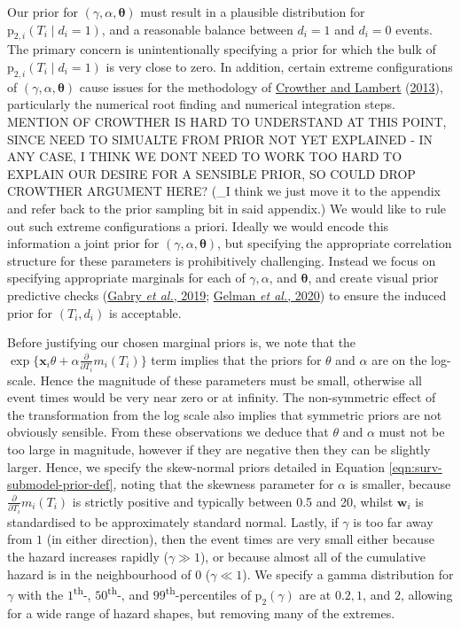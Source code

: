 \documentclass[
  10pt,
  a4paper,
]{article}
\newcommand{\pd}{\text{p}}
\begin{document}
Our prior for \((\gamma, \alpha, \boldsymbol{\theta})\) must result in a
plausible distribution for \(\pd_{2, i}(T_{i} \mid d_{i} = 1)\), and a
reasonable balance between \(d_{i} = 1\) and \(d_{i} = 0\) events. The
primary concern is unintentionally specifying a prior for which the bulk
of \(\pd_{2, i}(T_{i} \mid d_{i} = 1)\) is very close to zero. In
addition, certain extreme configurations of
\((\gamma, \alpha, \boldsymbol{\theta})\) cause issues for the
methodology of \protect\hyperlink{ref-crowther_simulating_2013}{Crowther
and Lambert} (\protect\hyperlink{ref-crowther_simulating_2013}{2013}),
particularly the numerical root finding and numerical integration steps.
MENTION OF CROWTHER IS HARD TO UNDERSTAND AT THIS POINT, SINCE NEED TO
SIMUALTE FROM PRIOR NOT YET EXPLAINED - IN ANY CASE, I THINK WE DONT
NEED TO WORK TOO HARD TO EXPLAIN OUR DESIRE FOR A SENSIBLE PRIOR, SO
COULD DROP CROWTHER ARGUMENT HERE? (\_I think we just move it to the
appendix and refer back to the prior sampling bit in said appendix.) We
would like to rule out such extreme configurations a priori. Ideally we
would encode this information a joint prior for
\((\gamma, \alpha, \boldsymbol{\theta})\), but specifying the
appropriate correlation structure for these parameters is prohibitively
challenging. Instead we focus on specifying appropriate marginals for
each of \(\gamma, \alpha\), and \(\boldsymbol{\theta}\), and create
visual prior predictive checks
(\protect\hyperlink{ref-gabry_visualization_2019}{Gabry \emph{et al.},
2019}; \protect\hyperlink{ref-gelman_bayesian_2020}{Gelman \emph{et
al.}, 2020}) to ensure the induced prior for \((T_{i}, d_{i})\) is
acceptable.

Before justifying our chosen marginal priors is, we note that the
\(\exp\{\boldsymbol{x}_{i}\theta + \alpha \frac{\partial}{\partial T_{i}} m_{i}(T_{i})\}\)
term implies that the priors for \(\theta\) and \(\alpha\) are on the
log-scale. Hence the magnitude of these parameters must be small,
otherwise all event times would be very near zero or at infinity. The
non-symmetric effect of the transformation from the log scale also
implies that symmetric priors are not obviously sensible. From these
observations we deduce that \(\theta\) and \(\alpha\) must not be too
large in magnitude, however if they are negative then they can be
slightly larger. Hence, we specify the skew-normal priors detailed in
Equation \eqref{eqn:surv-submodel-prior-def}, noting that the skewness
parameter for \(\alpha\) is smaller, because
\(\frac{\partial}{\partial T_{i}} m_{i}(T_{i})\) is strictly positive
and typically between 0.5 and 20, whilst \(\boldsymbol{w}_{i}\) is
standardised to be approximately standard normal. Lastly, if \(\gamma\)
is too far away from \(1\) (in either direction), then the event times
are very small either because the hazard increases rapidly
(\(\gamma \gg 1\)), or because almost all of the cumulative hazard is in
the neighbourhood of 0 (\(\gamma \ll 1\)). We specify a gamma
distribution for \(\gamma\) with the \(1\)\textsuperscript{th}-,
\(50\)\textsuperscript{th}-, and \(99\)\textsuperscript{th}-percentiles
of \(\pd_{2}(\gamma)\) are at \(0.2, 1\), and \(2\), allowing for a wide
range of hazard shapes, but removing many of the extremes.
\end{document}
